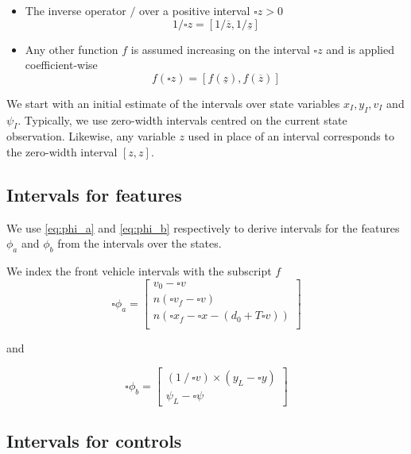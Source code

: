 \documentclass{article}
\newcommand{\interval}[1]{\square #1}
\newcommand{\imin}[1]{\underline{#1}}
\newcommand{\imax}[1]{\overline{#1}}
\begin{document}
\begin{itemize}
\item The inverse operator $/$ over a positive interval $\interval{z} > 0$
\begin{equation}
1 / \interval{z} = [1/\imax{z}, 1/\imin{z}]
\end{equation}

\item Any other function $f$ is assumed increasing on the interval $\interval{z}$ and is applied coefficient-wise
\begin{equation}
f(\interval{z}) = [f(\imin{z}), f(\imax{z})]
\end{equation}

\end{itemize}

We start with an initial estimate of the intervals over state variables $x_I, y_I, v_I$ and $\psi_I$. Typically, we use zero-width intervals centred on the current state observation. Likewise, any variable $z$ used in place of an interval corresponds to the zero-width interval $[z, z]$.

\subsection{Intervals for features}

We use \eqref{eq:phi_a} and \eqref{eq:phi_b} respectively to derive intervals for the features $\phi_a$ and $\phi_b$ from the intervals over the states.

We index the front vehicle intervals with the subscript $f$
\begin{equation}
\interval{\phi_a} = \begin{bmatrix}
v_0 - \interval{v} \\
n(\interval{v_{f}} - \interval{v}) \\
n(\interval{x_{f}} - \interval{x} - (d_0 + T\interval{v})) \\
\end{bmatrix}
\end{equation}

and

\begin{equation}
\interval{\phi_b} = \begin{bmatrix}
(1 ~ / ~ \interval{v}) \times (y_L - \interval{y})\\
\psi_L - \interval{\psi}
\end{bmatrix}
\end{equation}

\subsection{Intervals for controls}
\end{document}
